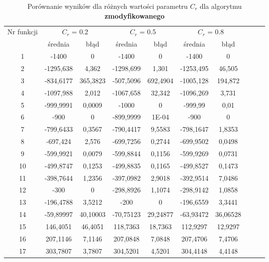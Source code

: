 \documentclass[a4paper,12pt]{article}
\theoremstyle{definition}
\begin{document}
\begin{table}[H]
\centering
\def\arraystretch{1.3}
\setlength\tabcolsep{10pt}
\caption{Porównanie wyników dla różnych wartości parametru $C_r$ dla algorytmu \textbf{zmodyfikowanego}}
\vspace{8pt}
\begin{tabular}{|c|c|c|c|c|c|c|c|c|c|}
	
	\hline
	\multirow{2}{*}{Nr funkcji} & \multicolumn{2}{c|}{$C_r$ = 0.2} & \multicolumn{2}{c|}{$C_r$ = 0.5} & \multicolumn{2}{c|}{$C_r$ = 0.8}\\
	\cline{2-7}
	& średnia & błąd & średnia & błąd & średnia & błąd \\\hline
	1     & -1400 & 0     & -1400 & 0     & -1400 & 0 \\\hline
    2     & -1295,638 & 4,362 & -1298,699 & 1,301 & -1253,495 & 46,505 \\\hline
    3     & -834,6177 & 365,3823 & -507,5096 & 692,4904 & -1005,128 & 194,872 \\\hline
    4     & -1097,988 & 2,012 & -1067,658 & 32,342 & -1096,269 & 3,731 \\\hline
    5     & -999,9991 & 0,0009 & -1000 & 0     & -999,99 & 0,01 \\\hline
    6     & -900  & 0     & -899,9999 & 1E-04 & -900  & 0 \\\hline
    7     & -799,6433 & 0,3567 & -790,4417 & 9,5583 & -798,1647 & 1,8353 \\\hline
    8     & -697,424 & 2,576 & -699,7256 & 0,2744 & -699,9502 & 0,0498 \\\hline
    9     & -599,9921 & 0,0079 & -599,8844 & 0,1156 & -599,9269 & 0,0731 \\\hline
    10    & -499,8747 & 0,1253 & -499,8835 & 0,1165 & -499,8527 & 0,1473 \\\hline
    11    & -398,7644 & 1,2356 & -397,0982 & 2,9018 & -392,9514 & 7,0486 \\\hline
    12    & -300  & 0     & -298,8926 & 1,1074 & -298,9142 & 1,0858 \\\hline
    13    & -196,4788 & 3,5212 & -200  & 0     & -196,6559 & 3,3441 \\\hline
    14    & -59,89997 & 40,10003 & -70,75123 & 29,24877 & -63,93472 & 36,06528 \\\hline
    15    & 146,4051 & 46,4051 & 118,7363 & 18,7363 & 112,9297 & 12,9297 \\\hline
    16    & 207,1146 & 7,1146 & 207,0848 & 7,0848 & 207,4706 & 7,4706 \\\hline
    17    & 303,7807 & 3,7807 & 304,5201 & 4,5201 & 304,4148 & 4,4148 \\\hline

\end{tabular}
\end{table}
\end{document}
